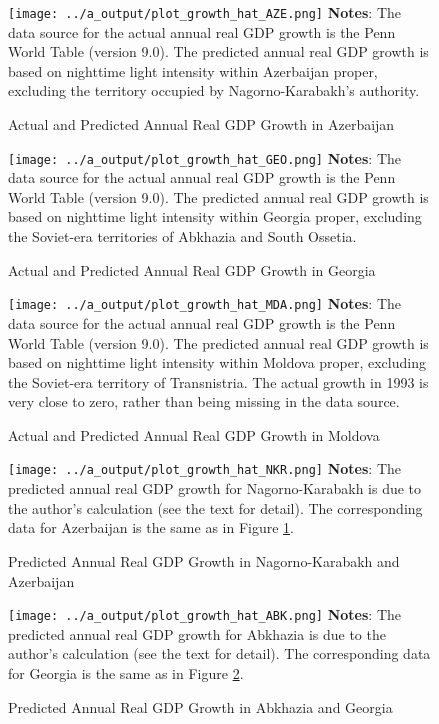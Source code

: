 \documentclass[12pt,a4paper]{article}%
\begin{document}
\begin{figure}[ptb]
\caption{Actual and Predicted Annual Real GDP Growth in Azerbaijan}
\texttt{[image: ../a\_output/plot\_growth\_hat\_AZE.png]}
\label{aze}%
{\scriptsize \textbf{Notes}: 
	The data source for the actual annual real GDP growth is the Penn World Table (version 9.0). 
	The predicted annual real GDP growth is based on nighttime light intensity within Azerbaijan proper, excluding the territory occupied by Nagorno-Karabakh's authority. 
}
\end{figure}

\begin{figure}[ptb]
\caption{Actual and Predicted Annual Real GDP Growth in Georgia}
\texttt{[image: ../a\_output/plot\_growth\_hat\_GEO.png]}
\label{geo}%
{\scriptsize \textbf{Notes}: 
	The data source for the actual annual real GDP growth is the Penn World Table (version 9.0). 
	The predicted annual real GDP growth is based on nighttime light intensity within Georgia proper, excluding the Soviet-era territories of Abkhazia and South Ossetia. 
}
\end{figure}

\begin{figure}[ptb]
\caption{Actual and Predicted Annual Real GDP Growth in Moldova}
\texttt{[image: ../a\_output/plot\_growth\_hat\_MDA.png]}
\label{mda}%
{\scriptsize \textbf{Notes}: 
	The data source for the actual annual real GDP growth is the Penn World Table (version 9.0). 
	The predicted annual real GDP growth is based on nighttime light intensity within Moldova proper, excluding the Soviet-era territory of Transnistria. 
	The actual growth in 1993 is very close to zero, rather than being missing in the data source.
}
\end{figure}

\begin{figure}[ptb]
\caption{Predicted Annual Real GDP Growth in Nagorno-Karabakh and Azerbaijan}
\texttt{[image: ../a\_output/plot\_growth\_hat\_NKR.png]}
\label{nkr}%
{\scriptsize \textbf{Notes}: 
	The predicted annual real GDP growth for Nagorno-Karabakh is due to the author's calculation (see the text for detail).
	The corresponding data for Azerbaijan is the same as in Figure \ref{aze}.
}
\end{figure}

\begin{figure}[ptb]
\caption{Predicted Annual Real GDP Growth in Abkhazia and Georgia}
\texttt{[image: ../a\_output/plot\_growth\_hat\_ABK.png]}
\label{abk}%
{\scriptsize \textbf{Notes}: 
	The predicted annual real GDP growth for Abkhazia is due to the author's calculation (see the text for detail).
	The corresponding data for Georgia is the same as in Figure \ref{geo}.
}
\end{figure}
\end{document}
